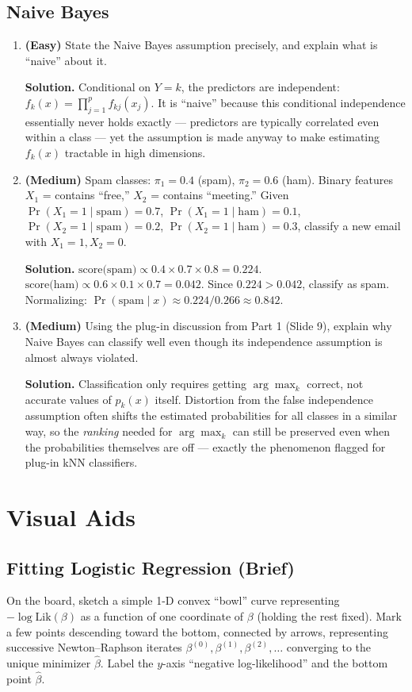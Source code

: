 \documentclass[11pt]{article}
\begin{document}
\subsection{Naive Bayes}
\begin{enumerate}
\item \textbf{(Easy)} State the Naive Bayes assumption precisely, and explain what is ``naive'' about it.

\textbf{Solution.} Conditional on $Y=k$, the predictors are independent: $f_k(x) = \prod_{j=1}^p f_{kj}(x_j)$. It is ``naive'' because this conditional independence essentially never holds exactly --- predictors are typically correlated even within a class --- yet the assumption is made anyway to make estimating $f_k(x)$ tractable in high dimensions.

\item \textbf{(Medium)} Spam classes: $\pi_1{=}0.4$ (spam), $\pi_2{=}0.6$ (ham). Binary features $X_1$ = contains ``free,'' $X_2$ = contains ``meeting.'' Given $\Pr(X_1{=}1\mid\text{spam}){=}0.7$, $\Pr(X_1{=}1\mid\text{ham}){=}0.1$, $\Pr(X_2{=}1\mid\text{spam}){=}0.2$, $\Pr(X_2{=}1\mid\text{ham}){=}0.3$, classify a new email with $X_1{=}1, X_2{=}0$.

\textbf{Solution.} $\text{score(spam)} \propto 0.4\times0.7\times0.8 = 0.224$. $\text{score(ham)}\propto 0.6\times0.1\times0.7=0.042$. Since $0.224 > 0.042$, classify as spam. Normalizing: $\Pr(\text{spam}\mid x)\approx 0.224/0.266\approx0.842$.

\item \textbf{(Medium)} Using the plug-in discussion from Part 1 (Slide 9), explain why Naive Bayes can classify well even though its independence assumption is almost always violated.

\textbf{Solution.} Classification only requires getting $\arg\max_k$ correct, not accurate values of $p_k(x)$ itself. Distortion from the false independence assumption often shifts the estimated probabilities for all classes in a similar way, so the \emph{ranking} needed for $\arg\max_k$ can still be preserved even when the probabilities themselves are off --- exactly the phenomenon flagged for plug-in kNN classifiers.
\end{enumerate}

\section{Visual Aids}

\subsection{Fitting Logistic Regression (Brief)}
\begin{instructornote}
On the board, sketch a simple 1-D convex ``bowl'' curve representing $-\log\mathrm{Lik}(\beta)$ as a function of one coordinate of $\beta$ (holding the rest fixed). Mark a few points descending toward the bottom, connected by arrows, representing successive Newton--Raphson iterates $\beta^{(0)},\beta^{(1)},\beta^{(2)},\dots$ converging to the unique minimizer $\hat\beta$. Label the $y$-axis ``negative log-likelihood'' and the bottom point $\hat\beta$.
\end{instructornote}
\end{document}
